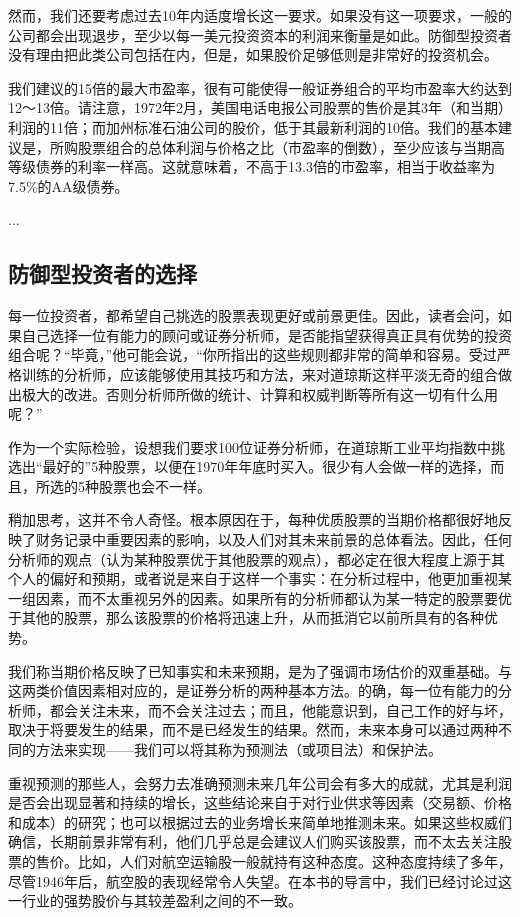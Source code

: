 \documentclass[12pt,oneside]{book}
\begin{document}
然而，我们还要考虑过去10年内适度增长这一要求。如果没有这一项要求，一般的公司都会出现退步，至少以每一美元投资资本的利润来衡量是如此。防御型投资者没有理由把此类公司包括在内，但是，如果股价足够低则是非常好的投资机会。

我们建议的15倍的最大市盈率，很有可能使得一般证券组合的平均市盈率大约达到12～13倍。请注意，1972年2月，美国电话电报公司股票的售价是其3年（和当期）利润的11倍；而加州标准石油公司的股价，低于其最新利润的10倍。我们的基本建议是，所购股票组合的总体利润与价格之比（市盈率的倒数），至少应该与当期高等级债券的利率一样高。这就意味着，不高于13.3倍的市盈率，相当于收益率为7.5\%的AA级债券。

...





\subsection{防御型投资者的选择}
每一位投资者，都希望自己挑选的股票表现更好或前景更佳。因此，读者会问，如果自己选择一位有能力的顾问或证券分析师，是否能指望获得真正具有优势的投资组合呢？“毕竟，”他可能会说，“你所指出的这些规则都非常的简单和容易。受过严格训练的分析师，应该能够使用其技巧和方法，来对道琼斯这样平淡无奇的组合做出极大的改进。否则分析师所做的统计、计算和权威判断等所有这一切有什么用呢？”

作为一个实际检验，设想我们要求100位证券分析师，在道琼斯工业平均指数中挑选出“最好的”5种股票，以便在1970年年底时买入。很少有人会做一样的选择，而且，所选的5种股票也会不一样。

稍加思考，这并不令人奇怪。根本原因在于，每种优质股票的当期价格都很好地反映了财务记录中重要因素的影响，以及人们对其未来前景的总体看法。因此，任何分析师的观点（认为某种股票优于其他股票的观点），都必定在很大程度上源于其个人的偏好和预期，或者说是来自于这样一个事实：在分析过程中，他更加重视某一组因素，而不太重视另外的因素。如果所有的分析师都认为某一特定的股票要优于其他的股票，那么该股票的价格将迅速上升，从而抵消它以前所具有的各种优势。

我们称当期价格反映了已知事实和未来预期，是为了强调市场估价的双重基础。与这两类价值因素相对应的，是证券分析的两种基本方法。的确，每一位有能力的分析师，都会关注未来，而不会关注过去；而且，他能意识到，自己工作的好与坏，取决于将要发生的结果，而不是已经发生的结果。然而，未来本身可以通过两种不同的方法来实现——我们可以将其称为预测法（或项目法）和保护法。

重视预测的那些人，会努力去准确预测未来几年公司会有多大的成就，尤其是利润是否会出现显著和持续的增长，这些结论来自于对行业供求等因素（交易额、价格和成本）的研究；也可以根据过去的业务增长来简单地推测未来。如果这些权威们确信，长期前景非常有利，他们几乎总是会建议人们购买该股票，而不太去关注股票的售价。比如，人们对航空运输股一般就持有这种态度。这种态度持续了多年，尽管1946年后，航空股的表现经常令人失望。在本书的导言中，我们已经讨论过这一行业的强势股价与其较差盈利之间的不一致。
\end{document}
